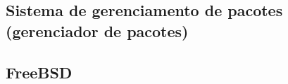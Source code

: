     \subsection{Sistema de gerenciamento de pacotes (gerenciador de pacotes)}

    \subsection{FreeBSD}

    
     
        

    
    
